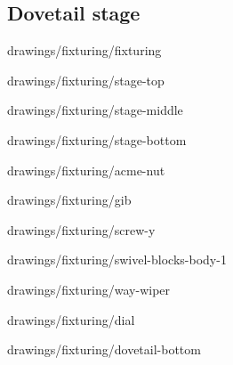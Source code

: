 \subsection{Dovetail stage}


            {drawings/fixturing/fixturing}


            {drawings/fixturing/stage-top}


            {drawings/fixturing/stage-middle}
	     

            {drawings/fixturing/stage-bottom}


            {drawings/fixturing/acme-nut}


            {drawings/fixturing/gib}


            {drawings/fixturing/screw-y}

            {drawings/fixturing/swivel-blocks-body-1}


            {drawings/fixturing/way-wiper}

            {drawings/fixturing/dial}


            {drawings/fixturing/dovetail-bottom}

